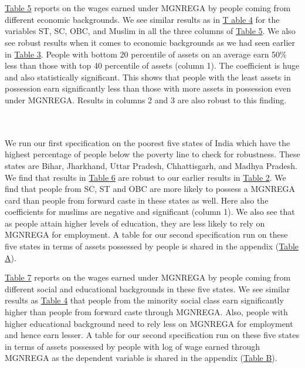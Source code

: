 \documentclass{article}
\begin{document}
\\
\\
\hyperref[tab5]{Table 5} reports on the wages earned under MGNREGA by people coming from different economic backgrounds. We see similar results as in \hyperref[tab4]{T able 4} for the variables ST, SC, OBC, and Muslim in all the three columns of \hyperref[tab5]{Table 5}. We also see robust results when it comes to economic backgrounds as we had seen earlier in \hyperref[tab3]{Table 3}. People with bottom 20 percentile of assets on an average earn 50\% less than those with top 40 percentile of assets (column 1). The coefficient is huge and also statistically significant. This shows that people with the least assets in possession earn significantly less than those with more assets in possession even under MGNREGA. Results in columns 2 and 3 are also robust to this finding.

\\

\\
We run our first specification on the poorest five states of India which have the highest percentage of people below the poverty line to check for robustness. These states are Bihar, Jharkhand, Uttar Pradesh, Chhattisgarh, and Madhya Pradesh. We find that results in \hyperref[tab6]{Table 6} are robust to our earlier results in \hyperref[tab2]{Table 2}. We find that people from SC, ST and OBC are more likely to possess a MGNREGA card than people from forward caste in these states as well. Here also the coefficients for muslims are negative and significant (column 1). We also see that as people attain higher levels of education, they are less likely to rely on MGNREGA for employment. A table for our second specification run on these five states in terms of assets possessed by people is shared in the appendix (\hyperref[tabA]{Table A}).

\hyperref[tab7]{Table 7} reports on the wages earned under MGNREGA by people coming from different social and educational backgrounds in these five states. We see similar results as \hyperref[tab4]{Table 4} that people from the minority social class earn significantly higher than people from forward caste through MGNREGA. Also, people with higher educational background need to rely less on MGNREGA for employment and hence earn lesser. A table for our second specification run on these five states in terms of assets possessed by people with log of wage earned through MGNREGA as the dependent variable is shared in the appendix (\hyperref[tabB]{Table B}).
\end{document}
